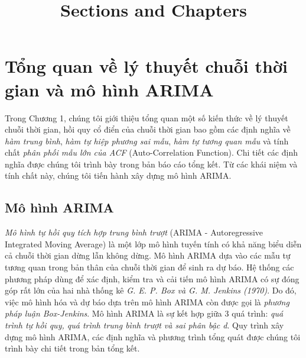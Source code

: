 \documentclass[12pt, a4paper,oneside]{book}
\title{Sections and Chapters}
\theoremstyle{definition}
\begin{document}
	\tableofcontents
	
	
	
	\chapter{Tổng quan về lý thuyết chuỗi thời gian và mô hình ARIMA}

Trong Chương 1, chúng tôi giới thiệu tổng quan một số kiến thức về lý thuyết chuỗi thời gian, hồi quy cổ điển của chuỗi thời gian bao gồm các định nghĩa về \textit{hàm trung bình}, \textit{hàm tự hiệp phương sai mẫu}, \textit{hàm tự tương quan mẫu} và tính chất \textit{phân phối mẫu lớn của ACF} (Auto-Correlation Function). Chi tiết các định nghĩa được chúng tôi trình bày trong bản báo cáo tổng kết. Từ các khái niệm và tính chất này, chúng tôi tiến hành xây dựng mô hình ARIMA.

\section{Mô hình ARIMA}
\textit{Mô hình tự hồi quy tích hợp trung bình trượt} (ARIMA - Autoregressive Integrated Moving Average) là một lớp mô hình tuyến tính có khả năng biểu diễn cả chuỗi thời gian dừng lẫn không dừng. Mô hình ARIMA dựa vào các mẫu tự tương quan trong bản thân của chuỗi thời gian để sinh ra dự báo. Hệ thống các phương pháp dùng để xác định, kiểm tra và cải tiến mô hình ARIMA có sự đóng góp rất lớn của hai nhà thống kê \textit{G. E. P. Box và G. M. Jenkins (1970)}. Do đó, việc mô hình hóa và dự báo dựa trên mô hình ARIMA còn được gọi là \textit{phương pháp luận Box-Jenkins}. Mô hình ARIMA là sự kết hợp giữa 3 quá trình: \textit{quá trình tự hồi quy, quá trình trung bình trượt và sai phân bậc d}. Quy trình xây dựng mô hình ARIMA, các định nghĩa và phương trình tổng quát được chúng tôi trình bày chi tiết trong bản tổng kết. 
\end{document}
